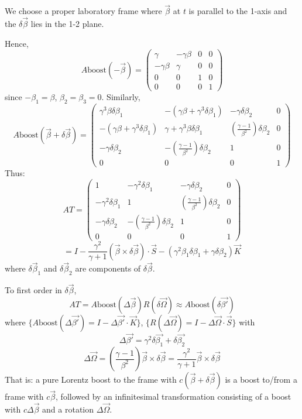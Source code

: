 \documentclass{article}
\begin{document}
	
	
	We choose a proper laboratory frame where $\vec{\beta}$ at $t$ is parallel to the 1-axis and the $\delta\vec{\beta}$ lies in the 1-2 plane.
	
	Hence,
	$$ A \text{boost}(-\vec{\beta}) = \begin{pmatrix} \gamma & -\gamma\beta & 0 & 0 \\ -\gamma\beta & \gamma & 0 & 0 \\ 0 & 0 & 1 & 0 \\ 0 & 0 & 0 & 1 \end{pmatrix} $$
	since $-\beta_1 = \beta$, $\beta_2 = \beta_3 = 0$.
	Similarly,
	$$ A \text{boost}(\vec{\beta}+\delta\vec{\beta}) = \begin{pmatrix} \gamma^3 \beta \delta\beta_1 & -(\gamma\beta+\gamma^3\delta\beta_1) & -\gamma\delta\beta_2 & 0 \\ -(\gamma\beta+\gamma^3\delta\beta_1) & \gamma+\gamma^3\beta\delta\beta_1 & (\frac{\gamma-1}{\beta^2})\delta\beta_2 & 0 \\ -\gamma\delta\beta_2 & -(\frac{\gamma-1}{\beta^2})\delta\beta_2 & 1 & 0 \\ 0 & 0 & 0 & 1 \end{pmatrix} $$
	Thus:
	$$ AT = \begin{pmatrix} 1 & -\gamma^2 \delta\beta_1 & -\gamma\delta\beta_2 & 0 \\ -\gamma^2 \delta\beta_1 & 1 & (\frac{\gamma-1}{\beta^2})\delta\beta_2 & 0 \\ -\gamma\delta\beta_2 & -(\frac{\gamma-1}{\beta^2})\delta\beta_2 & 1 & 0 \\ 0 & 0 & 0 & 1 \end{pmatrix} $$
	$$ = I - \frac{\gamma^2}{\gamma+1} (\vec{\beta} \times \delta\vec{\beta}) \cdot \vec{S} - (\gamma^2 \beta_1 \delta\beta_1 + \gamma \delta\beta_2) \vec{K} $$
	where $\delta\vec{\beta}_1$ and $\delta\vec{\beta}_2$ are components of $\delta\vec{\beta}$.
	
	To first order in $\delta\vec{\beta}$,
	$$ AT = A \text{boost}(\Delta\vec{\beta}) R(\delta\vec{\Omega}) \approx A \text{boost}(\delta\vec{\beta'}) $$
	where $\{ A \text{boost}(\Delta\vec{\beta'}) = I - \Delta\vec{\beta'} \cdot \vec{K} \}$, $\{ R(\Delta\vec{\Omega}) = I - \Delta\vec{\Omega} \cdot \vec{S} \}$
	with
	$$ \Delta\vec{\beta'} = \gamma^2 \delta\vec{\beta_1} + \delta\vec{\beta_2} $$
	$$ \Delta\vec{\Omega} = (\frac{\gamma-1}{\beta^2}) \vec{\beta} \times \delta\vec{\beta} = \frac{\gamma^2}{\gamma+1} \vec{\beta} \times \delta\vec{\beta} $$
	That is: a pure Lorentz boost to the frame with $c(\vec{\beta}+\delta\vec{\beta})$ is a boost to/from a frame with $c\vec{\beta}$, followed by an infinitesimal transformation consisting of a boost with $c\Delta\vec{\beta}$ and a rotation $\Delta\vec{\Omega}$.
	
\end{document}
